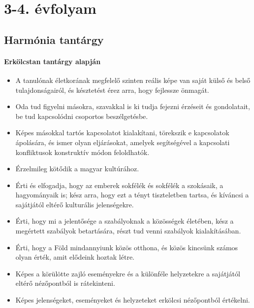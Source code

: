 \section{3-4. évfolyam}
\subsection{Harmónia tantárgy}
\paragraph{Erkölcstan tantárgy alapján}
\begin{itemize}
\item A tanulónak életkorának megfelelő szinten reális képe van saját külső és belső tulajdonságairól, és késztetést érez arra, hogy fejlessze önmagát.
\item Oda tud figyelni másokra, szavakkal is ki tudja fejezni érzéseit és gondolatait, be tud kapcsolódni csoportos beszélgetésbe.
\item Képes másokkal tartós kapcsolatot kialakítani, törekszik e kapcsolatok ápolására, és ismer olyan eljárásokat, amelyek segítségével a kapcsolati konfliktusok konstruktív módon feloldhatók.
\item Érzelmileg kötődik a magyar kultúrához.
\item Érti és elfogadja, hogy az emberek sokfélék és sokfélék a szokásaik, a hagyományaik is; kész arra, hogy ezt a tényt tiszteletben tartsa, és kíváncsi a sajátjától eltérő kulturális jelenségekre.
\item Érti, hogy mi a jelentősége a szabályoknak a közösségek életében, kész a megértett szabályok betartására, részt tud venni szabályok kialakításában.
\item Érti, hogy a Föld mindannyiunk közös otthona, és közös kincsünk számos olyan érték, amit elődeink hoztak létre.
\item Képes a körülötte zajló eseményekre és a különféle helyzetekre a sajátjától eltérő nézőpontból is rátekinteni.
\item Képes jelenségeket, eseményeket és helyzeteket erkölcsi nézőpontból értékelni.
\end{itemize}
